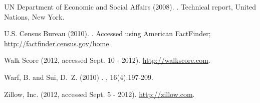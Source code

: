 \documentclass[12pt]{article}
\begin{document}
\begin{thebibliography}{00}
{UN Department of Economic and Social Affairs} (2008).
.
\newblock Technical report, United Nations, New York.

{U.S. Census Bureau} (2010).
.
\newblock Accessed using American FactFinder;
  \url{http://factfinder.census.gov/home}.

{Walk Score} (2012, accessed Sept. 10 - 2012).
\newblock \url{http://walkscore.com}.

Warf, B. and Sui, D.~Z. (2010)
.
, 16(4):197-209.

{Zillow, Inc.} (2012, accessed Sept. 5 - 2012).
\newblock \url{http://zillow.com}.

\end{thebibliography}
\end{document}
